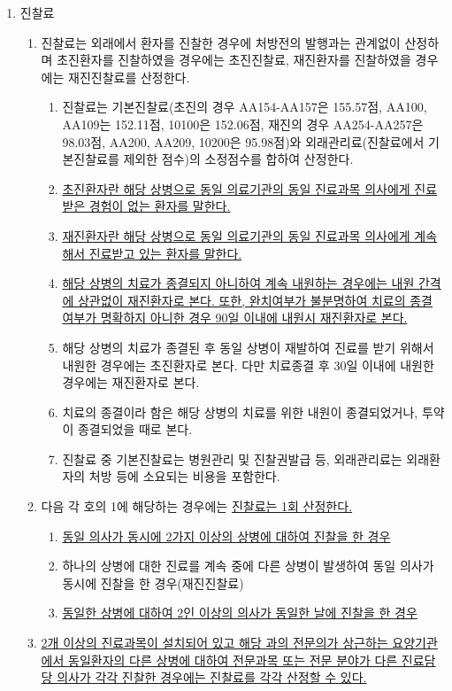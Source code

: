 \begin{enumerate}[1.]\tightlist
\item 진찰료
	\begin{enumerate}[가.]\tightlist
	\item 진찰료는 외래에서 환자를 진찰한 경우에 처방전의 발행과는 관계없이 산정하며 초진환자를 진찰하였을 경우에는 초진진찰료, 재진환자를 진찰하였을 경우에는 재진진찰료를 산정한다.
		\begin{enumerate}[(1)]\tightlist
		\item 진찰료는 기본진찰료(초진의 경우 AA154-AA157은 155.57점, AA100, AA109는 152.11점, 10100은 152.06점, 재진의 경우 AA254-AA257은 98.03점, AA200, AA209, 10200은 95.98점)와
외래관리료(진찰료에서 기본진찰료를 제외한 점수)의 소정점수를 합하여 산정한다.
		\item \uline{초진환자란 해당 상병으로 동일 의료기관의 동일 진료과목 의사에게 진료받은 경험이 없는 환자를 말한다.}
		\item \uline{재진환자란 해당 상병으로 동일 의료기관의 동일 진료과목 의사에게 계속해서 진료받고 있는 환자를 말한다.}
		\item \uline{해당 상병의 치료가 종결되지 아니하여 계속 내원하는 경우에는 내원 간격에 상관없이 재진환자로 본다. 또한, 완치여부가 불분명하여 치료의 종결 여부가 명확하지 아니한 경우 90일 이내에 내원시 재진환자로 본다.}
		\item 해당 상병의 치료가 종결된 후 동일 상병이 재발하여 진료를 받기 위해서 내원한 경우에는 초진환자로 본다. 다만 치료종결 후 30일 이내에 내원한 경우에는 재진환자로 본다.
		\item 치료의 종결이라 함은 해당 상병의 치료를 위한 내원이 종결되었거나, 투약이 종결되었을 때로 본다.
		\item 진찰료 중 기본진찰료는 병원관리 및 진찰권발급 등, 외래관리료는 외래환자의 처방 등에 소요되는 비용을 포함한다.
		\end{enumerate}
	\item 다음 각 호의 1에 해당하는 경우에는 \uline{진찰료는 1회 산정한다.}
		\begin{enumerate}[(1)]\tightlist
		\item \uline{동일 의사가 동시에 2가지 이상의 상병에 대하여 진찰을 한 경우}
		\item 하나의 상병에 대한 진료를 계속 중에 다른 상병이 발생하여 동일 의사가 동시에 진찰을 한 경우(재진진찰료)
		\item \uline{동일한 상병에 대하여 2인 이상의 의사가 동일한 날에 진찰을 한 경우}
		\end{enumerate}
	\item \uline{2개 이상의 진료과목이 설치되어 있고 해당 과의 전문의가 상근하는 요양기관에서 동일환자의 다른 상병에 대하여 전문과목 또는 전문 분야가 다른 진료담당 의사가 각각 진찰한 경우에는 진찰료를 각각 산정할 수 있다.}

\end{enumerate}
\end{enumerate}
